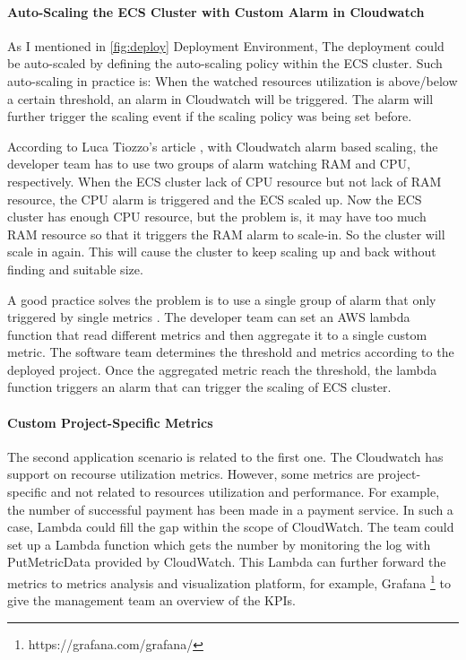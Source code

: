 \paragraph[]{Auto-Scaling the ECS Cluster with Custom Alarm in Cloudwatch}
As I mentioned in \ref{fig:deploy} Deployment Environment, The deployment could be auto-scaled by defining the auto-scaling policy within the ECS cluster. Such auto-scaling in practice is: When the watched resources utilization is above/below a certain threshold, an alarm in Cloudwatch will be triggered. The alarm will further trigger the scaling event if the scaling policy was being set before.
\par
According to Luca Tiozzo's article \cite{AWSECSho47:online}, with Cloudwatch alarm based scaling, the developer team has to use two groups of alarm watching RAM and CPU, respectively. When the ECS cluster lack of CPU resource but not lack of RAM resource, the CPU alarm is triggered and the ECS scaled up. Now the ECS cluster has enough CPU resource, but the problem is, it may have too much RAM resource so that it triggers the RAM alarm to scale-in. So the cluster will scale in again. This will cause the cluster to keep scaling up and back without finding and suitable size.
\par
A good practice solves the problem is to use a single group of alarm that only triggered by single metrics \cite{AWSECSho47:online}. The developer team can set an AWS lambda function that read different metrics and then aggregate it to a single custom metric. The software team determines the threshold and metrics according to the deployed project. Once the aggregated metric reach the threshold, the lambda function triggers an alarm that can trigger the scaling of ECS cluster. 
\paragraph[]{Custom Project-Specific Metrics}
The second application scenario is related to the first one. The Cloudwatch has support on recourse utilization metrics. However, some metrics are project-specific and not related to resources utilization and performance. For example, the number of successful payment has been made in a payment service. In such a case, Lambda could fill the gap within the scope of CloudWatch. The team could set up a Lambda function which gets the number by monitoring the log with PutMetricData provided by CloudWatch. This Lambda can further forward the metrics to metrics analysis and visualization platform, for example, Grafana \footnote{https://grafana.com/grafana/} to give the management team an overview of the KPIs.
